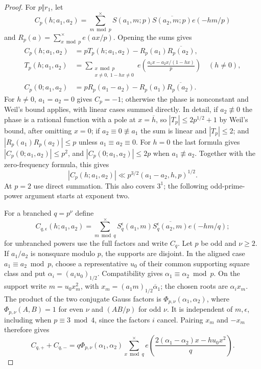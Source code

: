 \documentclass[12pt, a4paper]{amsart}
\numberwithin{equation}{section}
\newcommand{\e}{e}
\renewcommand{\bar}[1]{\overline{#1}}
\renewcommand{\le}{\leqslant}
\renewcommand{\ge}{\geqslant}
\theoremstyle{plain}
\begin{document}
\begin{proof}
For $p\Vert r_1$, let
$$
C_p(h;a_1,a_2)=\sum_{m\bmod p}^{\times}S(a_1,m;p)\overline{S(a_2,m;p)}\e(-hm/p)
$$
and $R_p(a)=\sum_{x\bmod p}^{\times}\e(ax/p)$. Opening the sums gives
$$
\begin{aligned}
 C_p(h;a_1,a_2)&=pT_p(h;a_1,a_2)
  -R_p(a_1)\overline{R_p(a_2)},\\
 T_p(h;a_1,a_2)&=
 \sum_{\substack{x\bmod p\\x\ne0,\ 1-hx\ne0}}
 \e\left(\frac{a_1x-a_2x/(1-hx)}p\right)\quad(h\ne0),\\
 C_p(0;a_1,a_2)&=pR_p(a_1-a_2)
  -R_p(a_1)\overline{R_p(a_2)}.
\end{aligned}
$$
For $h\ne0$, $a_1=a_2=0$ gives $C_p=-1$; otherwise the phase is nonconstant and Weil's bound applies, with linear cases summed directly. In detail, if $a_2\not\equiv0$ the phase is a rational function with a pole at $x=\bar h$, so $|T_p|\le2p^{1/2}+1$ by Weil's bound, after omitting $x=0$; if $a_2\equiv0\not\equiv a_1$ the sum is linear and $|T_p|\le2$; and $|R_p(a_1)R_p(a_2)|\le p$ unless $a_1\equiv a_2\equiv0$. For $h=0$ the last formula gives $|C_p(0;a_1,a_2)|\le p^2$, and $|C_p(0;a_1,a_2)|\le2p$ when $a_1\not\equiv a_2$. Together with the zero-frequency formula, this gives
\begin{equation}\label{eq:reciprocal-squarefree-bound}
 |C_p(h;a_1,a_2)|\ll
 p^{3/2}(a_1-a_2,h,p)^{1/2}.
\end{equation}
At $p=2$ use direct summation. This also covers $3^1$; the following odd-prime-power argument starts at exponent two.

For a branched $q=p^\nu$ define
$$
 C_{q,\epsilon}(h;a_1,a_2)=
 \sum_{m\bmod q}^{\times}S_q^\epsilon(a_1,m)
 \overline{S_q^\epsilon(a_2,m)}\e(-hm/q);
$$
for unbranched powers use the full factors and write $C_q$. Let $p$ be odd and $\nu\ge2$. If $a_1/a_2$ is nonsquare modulo $p$, the supports are disjoint. In the aligned case $a_1\equiv a_2\bmod p$, choose a representative $u_0$ of their common supporting square class and put $\alpha_i=(a_iu_0)_{1/2}$. Compatibility gives $\alpha_1\equiv\alpha_2\bmod p$. On the support write $m=u_0x_m^2$, with $x_m=(a_1m)_{1/2}\bar\alpha_1$; the chosen roots are $\alpha_ix_m$. The product of the two conjugate Gauss factors is $\Phi_{p,\nu}(\alpha_1,\alpha_2)$, where $\Phi_{p,\nu}(A,B)=1$ for even $\nu$ and $(AB/p)$ for odd $\nu$. It is independent of $m,\epsilon$, including when $p\equiv3\bmod4$, since the factors $i$ cancel. Pairing $x_m$ and $-x_m$ therefore gives
\begin{equation}\label{eq:reciprocal-paired-odd}
 C_{q,+}+C_{q,-}
 =q\Phi_{p,\nu}(\alpha_1,\alpha_2)\sum_{x\bmod q}^{\times}
  \e\left(\frac{2(\alpha_1-\alpha_2)x-hu_0x^2}{q}\right).
\end{equation}


\end{proof}
\end{document}
